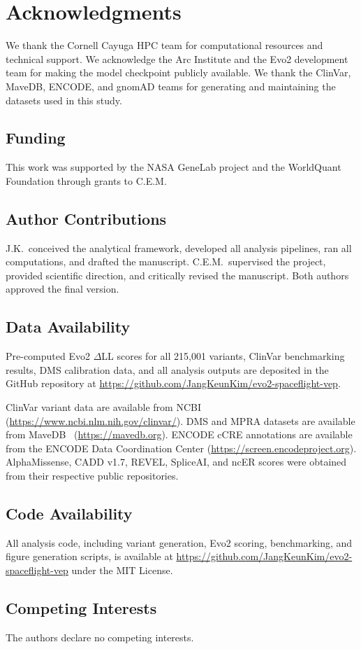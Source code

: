 \section*{Acknowledgments}

We thank the Cornell Cayuga HPC team for computational resources and technical
support. We acknowledge the Arc Institute and the Evo2 development team for
making the model checkpoint publicly available. We thank the ClinVar, MaveDB,
ENCODE, and gnomAD teams for generating and maintaining the datasets used in this
study.

\subsection*{Funding}

This work was supported by the NASA GeneLab project and the WorldQuant Foundation
through grants to C.E.M.

\subsection*{Author Contributions}

J.K.\ conceived the analytical framework, developed all analysis pipelines, ran
all computations, and drafted the manuscript. C.E.M.\ supervised the project,
provided scientific direction, and critically revised the manuscript. Both
authors approved the final version.

\subsection*{Data Availability}

Pre-computed Evo2 $\Delta$LL scores for all 215,001 variants, ClinVar benchmarking
results, DMS calibration data, and all analysis outputs are deposited in the
GitHub repository at \url{https://github.com/JangKeunKim/evo2-spaceflight-vep}.

ClinVar variant data are available from NCBI
(\url{https://www.ncbi.nlm.nih.gov/clinvar/}).
DMS and MPRA datasets are available from MaveDB~\cite{MaveDB_2019}
(\url{https://mavedb.org}).
ENCODE cCRE annotations are available from the ENCODE Data Coordination Center
(\url{https://screen.encodeproject.org}).
AlphaMissense, CADD v1.7, REVEL, SpliceAI, and ncER scores were obtained from
their respective public repositories.

\subsection*{Code Availability}

All analysis code, including variant generation, Evo2 scoring, benchmarking, and
figure generation scripts, is available at
\url{https://github.com/JangKeunKim/evo2-spaceflight-vep}
under the MIT License.

\subsection*{Competing Interests}
The authors declare no competing interests.
